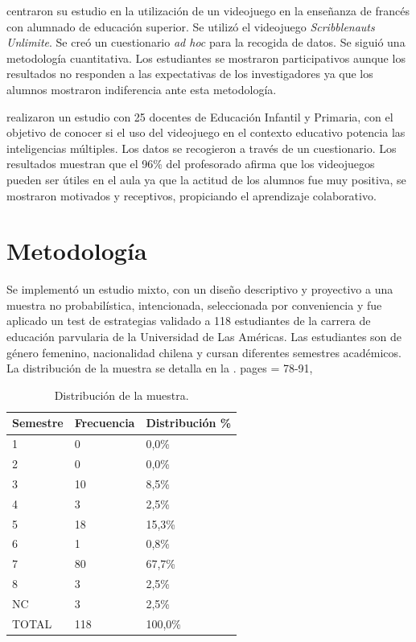 \documentclass[spanish]{textolivre}
\begin{document}
\textcite{brazomillan2018} %
centraron su estudio en la utilización de un videojuego en la enseñanza de francés con alumnado de educación superior. Se utilizó el videojuego \emph{Scribblenauts Unlimite}. Se creó un cuestionario \emph{ad hoc} para la recogida de datos. Se siguió una metodología cuantitativa. Los estudiantes se mostraron participativos aunque los resultados no responden a las expectativas de los investigadores ya que los alumnos mostraron indiferencia ante esta metodología.

\textcite{delmoral2015} %
realizaron un estudio con 25 docentes de Educación Infantil y Primaria, con el objetivo de conocer si el uso del videojuego en el contexto educativo potencia las inteligencias múltiples.  Los datos se recogieron a través de un cuestionario. Los resultados muestran que el 96\% del profesorado afirma que los videojuegos pueden ser útiles en el aula ya que la actitud de los alumnos fue muy positiva, se mostraron motivados y receptivos, propiciando el aprendizaje colaborativo.

\section{Metodología}

Se implementó un estudio mixto, con un diseño descriptivo y proyectivo a una muestra no probabilística, intencionada, seleccionada por conveniencia y fue aplicado un test de estrategias validado \cite{araneda2019, aravenagaete2020} %
a 118 estudiantes de la  carrera de educación parvularia de la Universidad de Las Américas. Las estudiantes son de género femenino, nacionalidad chilena y cursan diferentes semestres académicos. La distribución de la muestra se detalla en la .
	pages        = {78-91},


\begin{table}[htpb]
\centering
\caption{Distribución de la muestra.}
\label{tab2}
\begin{tabular}{lll}
\toprule 
Semestre & Frecuencia & Distribución \% \\ 
\midrule
1                 & 0                & 0,0\%
\\ 
2                 & 0                & 0,0\% 
\\ 
3                 & 10               & 8,5\%
\\
4                 & 3                & 2,5\%
\\
5                 & 18               & 15,3\%
\\
6                 & 1                & 0,8\%
\\
7                 & 80               & 67,7\%
\\
8                 & 3                & 2,5\%
\\
NC                & 3                & 2,5\%
\\
\midrule
TOTAL             & 118              & 100,0\%
\\
\bottomrule
\end{tabular}
\end{table}
\end{document}
